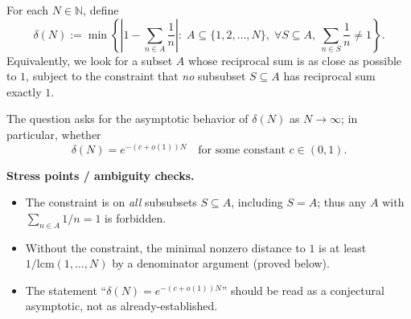 For each $N\in\mathbb N$, define
\[
\delta(N):=\min\left\{\left|1-\sum_{n\in A}\frac1n\right|:\;
A\subseteq\{1,2,\dots,N\},\;
\forall S\subseteq A,\ \sum_{n\in S}\frac1n\neq 1
\right\}.
\]
Equivalently, we look for a subset $A$ whose reciprocal sum is as close as possible to $1$,
subject to the constraint that \emph{no} subsubset $S\subseteq A$ has reciprocal sum exactly $1$.

The question asks for the asymptotic behavior of $\delta(N)$ as $N\to\infty$; in particular,
whether
\[
\delta(N)=e^{-(c+o(1))N}
\quad\text{for some constant }c\in(0,1).
\]

\textbf{Stress points / ambiguity checks.}
\begin{itemize}
\item The constraint is on \emph{all} subsubsets $S\subseteq A$, including $S=A$; thus any $A$ with $\sum_{n\in A}1/n=1$ is forbidden.
\item Without the constraint, the minimal nonzero distance to $1$ is at least $1/\mathrm{lcm}(1,\dots,N)$ by a denominator argument (proved below).
\item The statement ``$\delta(N)=e^{-(c+o(1))N}$'' should be read as a conjectural asymptotic, not as already-established.
\end{itemize}
